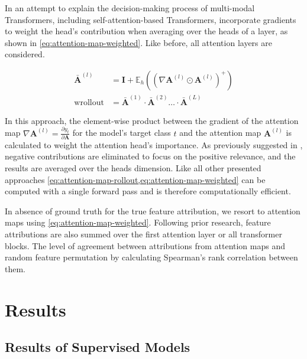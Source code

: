 In an attempt to explain the decision-making process of multi-modal Transformers, including self-attention-based Transformers, \textcite[][3]{cheferTransformerInterpretabilityAttention2021} incorporate gradients to weight the head's contribution when averaging over the heads of a layer, as shown in \cref{eq:attention-map-weighted}. Like before, all attention layers are considered.

\begin{equation}
    \begin{aligned}
        \bar{\mathbf{A}}^{(l)}   & =\mathbf{I} + \mathbb{E}_h\left(\left(\nabla \mathbf{A}^{(l)} \odot \mathbf{A}^{(l)}\right)^{+}\right) \\
        \operatorname {wrollout} & =\bar{\mathbf{A}}^{(1)} \cdot \bar{\mathbf{A}}^{(2)} \ldots \cdot \bar{\mathbf{A}}^{(L)}
    \end{aligned}
    \label{eq:attention-map-weighted}
\end{equation}

In this approach, the element-wise product between the gradient of the attention map $\nabla \mathbf{A}^{(l)}=\frac{\partial y_t}{\partial \mathbf{A}}$ for the model's target class $t$ and the attention map $\mathbf{A}^{(l)}$ is calculated to weight the attention head's importance. As previously suggested in \textcite[][786]{cheferTransformerInterpretabilityAttention2021}, negative contributions are eliminated to focus on the positive relevance, and the results are averaged over the heads dimension. Like all other presented approaches \cref{eq:attention-map-rollout,eq:attention-map-weighted} can be computed with a single forward pass and is therefore computationally efficient.

In absence of ground truth for the true feature attribution, we resort to attention maps using \cref{eq:attention-map-weighted}. Following prior research, feature attributions are also summed over the first attention layer or all transformer blocks. The level of agreement between attributions from attention maps and random feature permutation by calculating Spearman's rank correlation between them.

\newpage
\section{Results}\label{sec:results}


\subsection{Results of Supervised
    Models}\label{sec:results-of-supervised-models}

